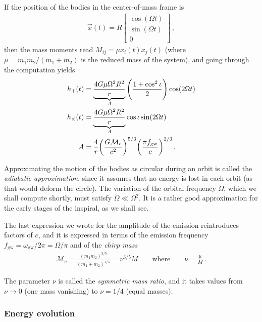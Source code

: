 \documentclass[main.tex]{subfiles}
\begin{document}
If the position of the bodies in the center-of-mass frame is 
%
\begin{align}
\vec{x}(t) = R \left[\begin{array}{c}
\cos(\Omega t) \\ 
\sin(\Omega t) \\ 
0
\end{array}\right]
\,,
\end{align}
%
then the mass moments read \(M_{ij} = \mu x_i (t) x_j(t)\) (where \(\mu = m_1 m_2 / (m_1 + m_2 ) \) is the reduced mass of the system), and going through the computation yields \cite[eq.\ 3.332]{maggioreGravitationalWavesVolume2007}
%
\begin{align} \label{eq:binary-waveform-1}
h_{+} (t) &= \underbrace{\frac{4 G \mu \Omega^2 R^2}{r}}_{A} \qty(\frac{1 + \cos^2 \iota }{2}) \cos( 2 \Omega t) 
\\
h_{ \times } (t) &= \underbrace{\frac{4 G \mu \Omega^2 R^2}{r}}_{A} \cos \iota  \sin( 2 \Omega t) 
\\
A &= \frac{4}{r} \qty(\frac{G\mathcal{M}_c}{c^2})^{5/3} \qty(\frac{\pi f _{\text{gw}}}{c})^{2/3} 
\,.
\end{align}

Approximating the motion of the bodies as circular during an orbit is called the \emph{adiabatic approximation}, since it assumes that no energy is lost in each orbit (as that would deform the circle). The variation of the orbital frequency \(\Omega \), which we shall compute shortly, must satisfy \(\dot{\Omega} \ll \Omega^2\). 
It is a rather good approximation for the early stages of the inspiral, as we shall see. 

The last expression we wrote for the amplitude of the emission reintroduces factors of \(c\), and it is expressed in terms of the emission frequency \(f _{\text{gw}} = \omega _{\text{gw}} / 2 \pi = \Omega / \pi \) and of the \emph{chirp mass}
%
\begin{align} \label{eq:chirp-mass}
\mathcal{M}_c = \frac{(m_1 m_2 )^{3/5}}{(m_1 + m_2 )^{1/5}} = \nu^{3/5} M 
\qquad \text{where} \qquad
\nu = \frac{\mu}{M}
\,.
\end{align}

The parameter \(\nu \) is called the \emph{symmetric mass ratio}, and it takes values from \(\nu \to 0\) (one mass vanishing) to \(\nu = 1/4\) (equal masses).

\subsubsection{Energy evolution}
\end{document}
